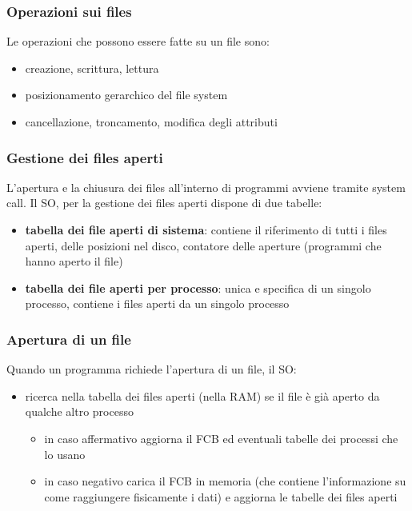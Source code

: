 \documentclass[a4paper]{article}
\begin{document}
\subsubsection*{Operazioni sui files}
Le operazioni che possono essere fatte su un file sono:
\begin{itemize}
	\item creazione, scrittura, lettura
	\item posizionamento gerarchico del file system
	\item cancellazione, troncamento, modifica degli attributi
\end{itemize}

\subsubsection*{Gestione dei files aperti}
L'apertura e la chiusura dei files all'interno di programmi avviene tramite system call. Il SO, per la gestione dei files aperti
dispone di due tabelle:
\begin{itemize}
	\item \textbf{tabella dei file aperti di sistema}: contiene il riferimento di tutti i files aperti, delle posizioni nel disco,
	contatore delle aperture (programmi che hanno aperto il file)
	\item \textbf{tabella dei file aperti per processo}: unica e specifica di un singolo processo, contiene i files aperti da un
	singolo processo
\end{itemize}

\subsubsection*{Apertura di un file}
Quando un programma richiede l'apertura di un file, il SO:
\begin{itemize}
	\item ricerca nella tabella dei files aperti (nella RAM) se il file è già aperto da qualche altro processo
	\begin{itemize}[topsep=0pt]
		\item in caso affermativo aggiorna il FCB ed eventuali tabelle dei processi che lo usano
		\item in caso negativo carica il FCB in memoria (che contiene l'informazione su come raggiungere fisicamente i dati) e
		aggiorna le tabelle dei files aperti
	\end{itemize}
\end{itemize}
\end{document}
